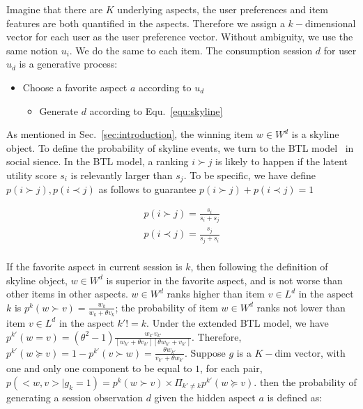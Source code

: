 \documentclass{sig-alternate}
\begin{document}
Imagine that there are $K$ underlying aspects, the user preferences and item features are both quantified in the aspects. Therefore we assign a $k-$dimensional vector for each user as the user preference vector. Without ambiguity, we use the same notion $u_i$. We do the same to each item. The consumption session $d$ for user $u_d$ is a generative process:


\begin{itemize}
	\item Choose a favorite aspect $a$ according to $u_d$
	
	\begin{itemize}
		\item Generate $d$ according to Equ.~\ref{equ:skyline}  
	\end{itemize}
\end{itemize}
  
As mentioned in Sec.~\ref{sec:introduction}, the winning item $w\in W^d$ is a skyline object. To define the probability of skyline events, we turn to the BTL model~\cite{Hunter2004MM} in social sience. In the BTL model, a ranking $i \succ j$ is likely to happen if the latent utility score $s_i$ is relevantly larger than $s_j$. To be specific, we have define $p(i \succ j), p(i \prec j)$ as follows to guarantee $p(i \succ j)+ p(i \prec j) =1$


\begin{align*}
	p(i \succ j)=\frac{s_i}{s_i+ s_j} \\
	p(i \prec j)=\frac{s_j}{s_j+ s_i} \\
\end{align*}
  
If the favorite aspect in current session is $k$, then following the definition of skyline object, $w\in W^d$ is superior in the favorite aspect,  and is not worse than other items in other aspects. $w\in W^d$ ranks higher than item $v\in L^d$ in the aspect $k$ is $p^k(w \succ v)=\frac{w_k}{w_k+\theta v_k}$; the probability of item $w\in W^d$ ranks not lower than item $v\in L^d$ in the aspect $k'!=k$. Under the extended BTL model, we have$p^{k'}(w = v)=(\theta^2-1)\frac{w_{k'}v_{k'}}{[w_{k'}+\theta v_{k'}][\theta w_{k'}+ v_{k'}]}$. Therefore, $p^{k'}(w \succeq v)=1- p^{k'} (v \succ w) = \frac{\theta w_{k'}}{v_{k'}+\theta w_{k'}}$. Suppose $g$ is a $K-$dim vector, with one and only one component to be equal to $1$, for each pair, $p(<w,v>|g_k=1) = p^k(w\succ v) \times \Pi_{k'\neq k} p^{k'}(w \succeq v)$. then the probability of generating a session observation $d$ given the hidden aspect $a$ is defined as:  
\end{document}

